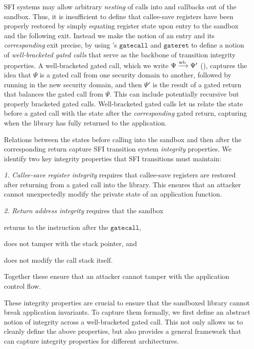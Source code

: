 %
SFI systems may allow arbitrary \emph{nesting}
of calls into and callbacks out of the sandbox.
%
Thus, it is insufficient to define that callee-save registers have been properly
restored by simply equating register state upon entry to the sandbox and the
following exit.
%
Instead we make the notion of an entry and its \emph{corresponding} exit
precise, by using \langname{}'s $\mathtt{gatecall}$ and $\mathtt{gateret}$ to
define a notion of \emph{well-bracketed gated calls} that serve as the backbone
of transition integrity properties.
%
A well-bracketed gated call, which we write $\Psi \mathrel{\xrightarrow{\!\text{wb}}} \Psi'$
(), captures the idea that $\Psi$ is a
gated call from one security domain to another, followed by running in the new
security domain, and then $\Psi'$ is the result of a gated return that balances
the gated call from $\Psi$.
%
This can include potentially recursive but properly bracketed gated calls.
%
Well-bracketed gated calls let us relate the state before a gated call with the
state after the \emph{corresponding} gated return, capturing when the library
has fully returned to the application.

%
Relations between the states before calling into the sandbox and then after the
corresponding return capture SFI transition system \emph{integrity} properties.
%
We identify two key integrity properties that SFI transitions must maintain:

\emph{1. Callee-save register integrity}
%
requires that callee-save registers are restored after returning from a gated
call into the library.
%
This ensures that an attacker cannot unexpectedly modify the private state of
an application function.

\emph{2. Return address integrity}
%
requires that the sandbox
%
\begin{enumerate*}
\item returns to the instruction after the $\mathtt{gatecall}$,
\item does not tamper with the stack pointer, and
\item does not modify the call stack itself.
\end{enumerate*}
%
Together these ensure that an attacker cannot tamper with the application
control flow.

These integrity properties are crucial to ensure that the sandboxed library cannot
break application invariants.
%
To capture them formally, we first define an abstract notion of integrity
across a well-bracketed gated call.
%
This not only allows us to cleanly define the above properties, but also
provides a general framework that can capture integrity properties for different
architectures.



